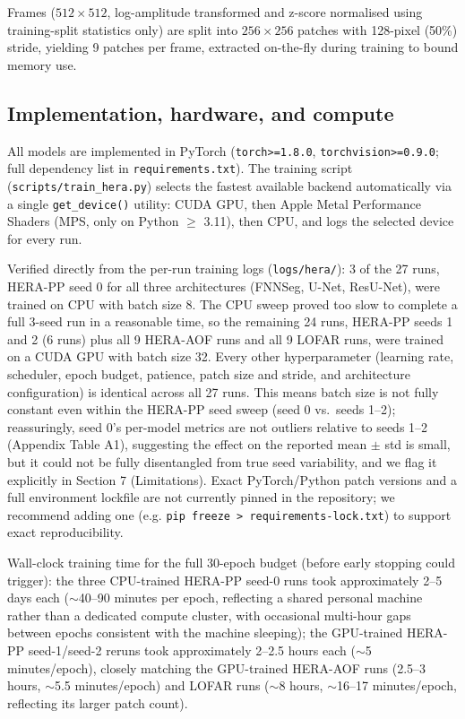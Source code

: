 \documentclass[11pt]{article}
\begin{document}
Frames ($512\times512$, log-amplitude transformed and z-score normalised using training-split statistics only) are split into $256\times256$ patches with 128-pixel (50\%) stride, yielding 9 patches per frame, extracted on-the-fly during training to bound memory use.

\subsection{Implementation, hardware, and compute}

All models are implemented in PyTorch (\texttt{torch>=1.8.0}, \texttt{torchvision>=0.9.0}; full dependency list in \texttt{requirements.txt}). The training script (\texttt{scripts/train\_hera.py}) selects the fastest available backend automatically via a single \texttt{get\_device()} utility: CUDA GPU, then Apple Metal Performance Shaders (MPS, only on Python $\geq$ 3.11), then CPU, and logs the selected device for every run.

Verified directly from the per-run training logs (\texttt{logs/hera/}): 3 of the 27 runs, HERA-PP seed 0 for all three architectures (FNNSeg, U-Net, ResU-Net), were trained on CPU with batch size 8. The CPU sweep proved too slow to complete a full 3-seed run in a reasonable time, so the remaining 24 runs, HERA-PP seeds 1 and 2 (6 runs) plus all 9 HERA-AOF runs and all 9 LOFAR runs, were trained on a CUDA GPU with batch size 32. Every other hyperparameter (learning rate, scheduler, epoch budget, patience, patch size and stride, and architecture configuration) is identical across all 27 runs. This means batch size is not fully constant even within the HERA-PP seed sweep (seed 0 vs.\ seeds 1--2); reassuringly, seed 0's per-model metrics are not outliers relative to seeds 1--2 (Appendix Table A1), suggesting the effect on the reported mean $\pm$ std is small, but it could not be fully disentangled from true seed variability, and we flag it explicitly in Section 7 (Limitations). Exact PyTorch/Python patch versions and a full environment lockfile are not currently pinned in the repository; we recommend adding one (e.g. \texttt{pip freeze > requirements-lock.txt}) to support exact reproducibility.

Wall-clock training time for the full 30-epoch budget (before early stopping could trigger): the three CPU-trained HERA-PP seed-0 runs took approximately 2--5 days each ($\sim$40--90 minutes per epoch, reflecting a shared personal machine rather than a dedicated compute cluster, with occasional multi-hour gaps between epochs consistent with the machine sleeping); the GPU-trained HERA-PP seed-1/seed-2 reruns took approximately 2--2.5 hours each ($\sim$5 minutes/epoch), closely matching the GPU-trained HERA-AOF runs (2.5--3 hours, $\sim$5.5 minutes/epoch) and LOFAR runs ($\sim$8 hours, $\sim$16--17 minutes/epoch, reflecting its larger patch count).
\end{document}
